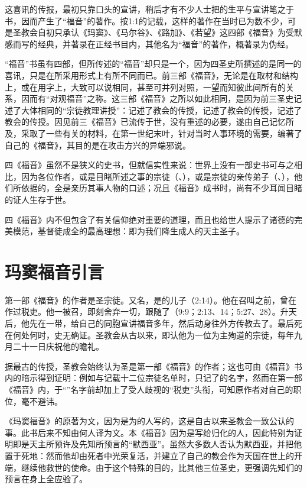 这喜讯的传报，最初只靠口头的宣讲，稍后才有不少人士把的生平与宣讲笔之于书，因而产生了“福音”的著作。按1:1的记载，这样的著作在当时已为数不少，可是圣教会自初只承认《玛窦》、《马尔谷》、《路加》、《若望》这四部《福音》为受默感而写的经典，并著录在正经书目内，其他名为“福音”的著作，概著录为伪经。

“福音”书虽有四部，但所传述的“福音”却只是一个，因为四圣史所撰述的是同一的喜讯，只是在所采用形式上有所不同而已。前三部《福音》，无论是在取材和结构上，或在用字上，大致可以说相同，甚至可并列对照，一望而知彼此间所有的关系，因而有“对观福音”之称。这三部《福音》之所以如此相同，是因为前三圣史记述了大体相同的“宗徒教理讲授”：\UL[玛窦]记述了\UL[耶路撒冷]教会的传授，\UL[马尔谷]记述了\UL[罗马]教会的传授，\UL[路加]记述了\UL[安提约基雅]教会的传授。\UL[若望]因见前三《福音》已流传于世，没有重述的必要，遂由自己记忆所及，采取了一些有关的材料，在第一世纪末叶，针对当时人事环境的需要，编著了自己的《福音》，其目的是在攻击方兴的异端邪说。

四《福音》虽然不是狭义的史书，但就信实性来说：世界上没有一部史书可与之相比，因为各位作者，或是目睹所述之事的宗徒（\UL[玛窦]、\UL[若望]），或是宗徒的亲传弟子（\UL[马尔谷]、\UL[路加]），他们所依据的，全是亲历其事人物的口述；况且《福音》成书时，尚有不少耳闻目睹的证人生存于世。

四《福音》内不但包含了有关信仰绝对重要的道理，而且也给世人提示了诸德的完美模范，基督徒成全的最高理想：即为我们降生成人的天主圣子。


\chapter*{玛窦福音引言}
第一部《福音》的作者是圣\UL[玛窦]宗徒。\UL[玛窦]又名\UL[肋未]，是\UL[阿耳斐]的儿子（2:14）。他在召叫之前，曾在\UL[葛法翁]作过税吏。他一被召，即刻舍弃一切，跟随了（9:9；2:13、14；5:27、28）。升天后，他先在\UL[巴力斯坦]一带，给自己的同胞宣讲福音多年，然后动身往外方传教去了。最后死在何处何时，史无确证。圣教会从古以来，即认他为一位为主殉道的宗徒，每年九月二十一日庆祝他的瞻礼。

据最古的传授，圣教会始终认为圣\UL[玛窦]是第一部《福音》的作者；这也可由《福音》书内的暗示得到证明：例如\UL[马尔谷]与\UL[路加]记载十二位宗徒名单时，只记了\UL[玛窦]的名字，然而在第一部《福音》内，于“\UL[玛窦]”名字前却加上了受人歧视的“税吏”头衔，可知原作者对自己的职位，毫不避讳。

《玛窦福音》的原著为\UL[阿刺美]文，因为是为\UL[巴力斯坦]的\UL[犹太]人写的，这是自古以来圣教会一致公认的事。此书后来不知由何人译为\UL[希腊]文。本《福音》因为是写给归化的\UL[犹太]人，因此特别为证明\UL[耶稣]\UL[基督]即是天主所预许及先知所预言的“默西亚”。虽然大多数\UL[犹太]人否认\UL[耶稣]为默西亚，并把他置于死地：然而他却由死者中光荣复活，并建立了自己的教会作为天国在世上的开端，继续他救世的使命。由于这个特殊的目的，\UL[玛窦]比其他三位圣史，更强调先知们的预言在\UL[耶稣]身上全应验了。

